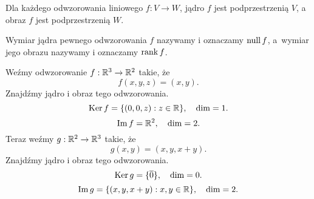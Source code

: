 \begin{fact}
    Dla każdego odwzorowania liniowego $f : V \to W$, jądro $f$ jest podprzestrzenią $V$, a obraz $f$ jest podprzestrzenią $W$.
\end{fact}

Wymiar jądra pewnego odwzorowania $f$ nazywamy  i oznaczamy $\operatorname{null} f$, a~wymiar jego obrazu nazywamy  i oznaczamy $\operatorname{rank} f$.

\begin{example}
    Weźmy odwzorowanie $f : \mathbb R^3 \to \mathbb R^2$ takie, że
    \[ f(x, y, z) = (x, y). \]
    Znajdźmy jądro i obraz tego odwzorowania.
    \[ \operatorname{Ker} f = \{(0, 0, z) : z \in \mathbb R\}, \quad \dim = 1. \]
    \[ \operatorname{Im} f = \mathbb R^2, \quad \dim = 2. \]
    Teraz weźmy $g : \mathbb R^2 \to \mathbb R^3$ takie, że
    \[ g(x, y) = (x, y, x + y). \]
    Znajdźmy jądro i obraz tego odwzorowania.
    \[ \operatorname{Ker} g = \{\overline{0}\}, \quad \dim = 0. \]
    \[ \operatorname{Im} g = \{(x, y, x+y) : x, y \in \mathbb R\}, \quad \dim = 2. \]
\end{example}

